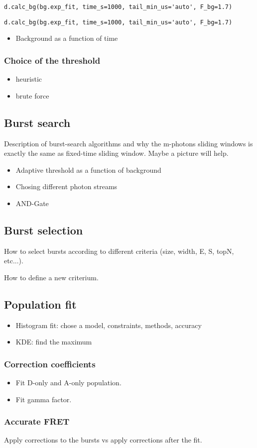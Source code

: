 \verb|d.calc_bg(bg.exp_fit, time_s=1000, tail_min_us='auto', F_bg=1.7)|

\verb|d.calc_bg(bg.exp_fit, time_s=1000, tail_min_us='auto', F_bg=1.7)|

\begin{itemize}
\item Background as a function of time
\end{itemize}

\subsubsection{Choice of the threshold}
\begin{itemize}
\item heuristic
\item brute force
\end{itemize}

\subsection{Burst search}

Description of burst-search algorithms and why the m-photons sliding windows is exactly the same as fixed-time sliding window. Maybe a picture will help.

\begin{itemize}
\item Adaptive threshold as a function of background
\item Chosing different photon streams
\item AND-Gate
\end{itemize}

\subsection{Burst selection}

How to select bursts according to different criteria (size, width, E, S, topN, etc...).

How to define a new criterium.


\subsection{Population fit}

\begin{itemize}
\item Histogram fit: chose a model, constraints, methods, accuracy
\item KDE: find the maximum
\end{itemize}

\subsubsection{Correction coefficients}

\begin{itemize}
\item Fit D-only and A-only population.
\item Fit gamma factor.
\end{itemize}


\subsubsection{Accurate FRET}

Apply corrections to the bursts vs apply corrections after the fit.

